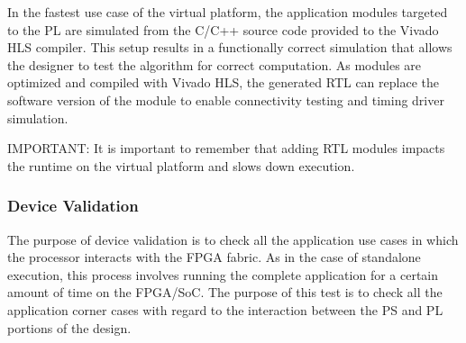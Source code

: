 \par In the fastest use case of the virtual platform, the application modules targeted to the PL
are simulated from the C/C++ source code provided to the Vivado HLS compiler. This setup
results in a functionally correct simulation that allows the designer to test the algorithm for
correct computation. As modules are optimized and compiled with Vivado HLS, the
generated RTL can replace the software version of the module to enable connectivity
testing and timing driver simulation.

\begin{highlight}
  IMPORTANT: It is important to remember that adding RTL modules impacts the runtime on the virtual
  platform and slows down execution.  
\end{highlight}


\subsubsection{Device Validation}
The purpose of device validation is to check all the application use cases in which the
processor interacts with the FPGA fabric. As in the case of standalone execution, this
process involves running the complete application for a certain amount of time on the FPGA/SoC.
The purpose of this test is to check all the application corner cases with
regard to the interaction between the PS and PL portions of the design.

